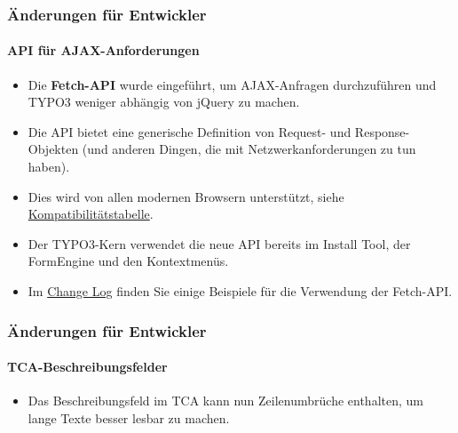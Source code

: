 
\begin{frame}[fragile]
	\frametitle{Änderungen für Entwickler}
	\framesubtitle{API für AJAX-Anforderungen}

	\lstset{basicstyle=\tiny\ttfamily}

	\begin{itemize}
		\item Die \textbf{Fetch-API} wurde eingeführt, um AJAX-Anfragen durchzuführen
			und TYPO3 weniger abhängig von jQuery zu machen.
		\item Die API bietet eine generische Definition von Request- und Response-Objekten
			(und anderen Dingen, die mit Netzwerkanforderungen zu tun haben).
		\item Dies wird von allen modernen Browsern unterstützt, siehe
			\href{https://developer.mozilla.org/en-US/docs/Web/API/Fetch_API}{Kompatibilitätstabelle}.
		\item Der TYPO3-Kern verwendet die neue API bereits im Install Tool, der FormEngine und
			den Kontextmenüs.
		\item Im
			\href{https://docs.typo3.org/c/typo3/cms-core/master/en-us/Changelog/10.3/Feature-89738-ApiForAjaxRequests.html}{Change Log}
			finden Sie einige Beispiele für die Verwendung der Fetch-API.

	\end{itemize}

\end{frame}


\begin{frame}[fragile]
	\frametitle{Änderungen für Entwickler}
	\framesubtitle{TCA-Beschreibungsfelder}

	\begin{itemize}
		\item Das Beschreibungsfeld im TCA kann nun Zeilenumbrüche enthalten, um lange Texte besser lesbar zu machen.
	\end{itemize}

\end{frame}


